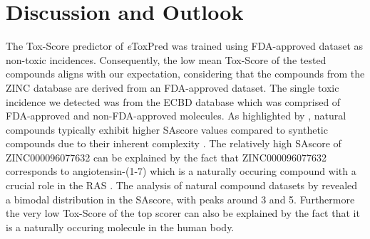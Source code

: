 \documentclass[11pt, letterpaper, titlepage]{article}
\renewcommand{\cite}{\parencite}
\begin{document}
\FloatBarrier

\section{Discussion and Outlook}

The Tox-Score predictor of \textit{e}ToxPred was trained using \ac{FDA}-approved dataset as non-toxic incidences. Consequently, the low mean Tox-Score of the tested compounds aligns with our expectation, considering that the compounds from the ZINC database are derived from an \ac{FDA}-approved dataset. The single toxic incidence we detected was from the ECBD database which was comprised of \ac{FDA}-approved and non-\ac{FDA}-approved molecules.
As highlighted by \citeauthor{pu2019toxpred}, natural compounds typically exhibit higher \ac{SAscore} values compared to synthetic compounds due to their inherent complexity \cite{pu2019toxpred}. The relatively high \ac{SAscore} of ZINC000096077632 can be explained by the fact that ZINC000096077632 corresponds to angiotensin-(1-7) which is a naturally occuring compound with a crucial role in the \ac{RAS} \cite{santosangiotensin}. The analysis of natural compound datasets by \citeauthor{pu2019toxpred} revealed a bimodal distribution in the \ac{SAscore}, with peaks around 3 and 5. Furthermore the very low Tox-Score of the top scorer can also be explained by the fact that it is a naturally occuring molecule in the human body. \\
\end{document}
